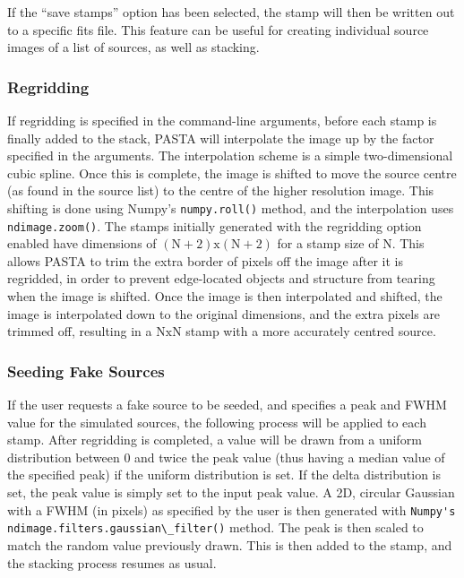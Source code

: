 \documentclass{article}
\begin{document}
If the ``save stamps'' option has been selected, the stamp will then be written 
out to a specific fits file.  This feature can be useful for creating individual
source images of a list of sources, as well as stacking.

\subsubsection{Regridding}
If regridding is specified in the command-line arguments, before each stamp
is finally added to the stack, PASTA will interpolate the image up by the factor
specified in the arguments. The interpolation scheme is a simple two-dimensional
cubic spline.  Once this is complete, the image is shifted to move the source 
centre (as found in the source list) to the centre of the higher resolution 
image.  This shifting is done using Numpy's \verb!numpy.roll()! method, and the
interpolation uses \verb!ndimage.zoom()!. The stamps initially generated with 
the regridding option enabled have dimensions of $\mathrm{(N+2)x(N+2)}$ for a 
stamp size of N. This allows PASTA to trim the extra border of pixels off the 
image after it is regridded, in order to prevent edge-located objects and 
structure from tearing when the image is shifted.   Once the image is then 
interpolated and shifted, the image is interpolated down to the original 
dimensions, and the extra pixels are trimmed off, resulting in a $\mathrm{NxN}$
stamp with a more accurately centred source.

\subsubsection{Seeding Fake Sources}
If the user requests a fake source to be seeded, and specifies a peak and FWHM 
value for the simulated sources, the following process will be applied to each 
stamp.  After regridding is completed, a value will be drawn from a uniform 
distribution between 0 and twice the peak value (thus having a median value of
the specified peak) if the uniform distribution is set. If the delta 
distribution is set, the peak value is simply set to the input peak value.
A 2D, circular Gaussian with a FWHM (in pixels) as 
specified by the user is then generated with 
\verb!Numpy's ndimage.filters.gaussian\_filter()! method.  The peak is then 
scaled to match the random value previously drawn.  This is then added to the 
stamp, and the stacking process resumes as usual.
\end{document}
